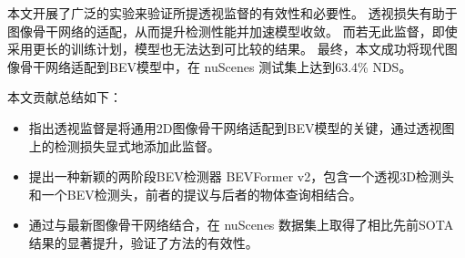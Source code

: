 本文开展了广泛的实验来验证所提透视监督的有效性和必要性。
透视损失有助于图像骨干网络的适配，从而提升检测性能并加速模型收敛。
而若无此监督，即使采用更长的训练计划，模型也无法达到可比较的结果。
最终，本文成功将现代图像骨干网络适配到BEV模型中，在 nuScenes \cite{nuscenes} 测试集上达到63.4\% NDS。

本文贡献总结如下：
 \begin{itemize}
     \item 指出透视监督是将通用2D图像骨干网络适配到BEV模型的关键，通过透视图上的检测损失显式地添加此监督。
     \item 提出一种新颖的两阶段BEV检测器 BEVFormer v2，包含一个透视3D检测头和一个BEV检测头，前者的提议与后者的物体查询相结合。
     \item 通过与最新图像骨干网络结合，在 nuScenes 数据集上取得了相比先前SOTA结果的显著提升，验证了方法的有效性。
 \end{itemize}
